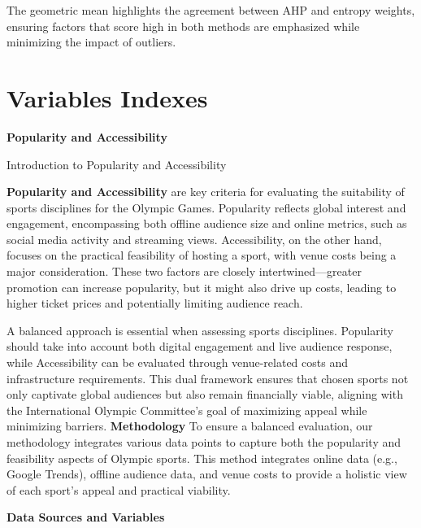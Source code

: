\documentclass[12pt]{article}
\begin{document}
The geometric mean highlights the agreement between AHP and entropy weights, ensuring factors that score high in both methods are emphasized while minimizing the impact of outliers.



\section{Variables Indexes}
\textbf{{Popularity and Accessibility}}

{Introduction to Popularity and Accessibility}

\textbf{Popularity and Accessibility} are key criteria for evaluating the suitability of sports disciplines for the Olympic Games. Popularity reflects global interest and engagement, encompassing both offline audience size and online metrics, such as social media activity and streaming views. Accessibility, on the other hand, focuses on the practical feasibility of hosting a sport, with venue costs being a major consideration. These two factors are closely intertwined—greater promotion can increase popularity, but it might also drive up costs, leading to higher ticket prices and potentially limiting audience reach.

A balanced approach is essential when assessing sports disciplines. Popularity should take into account both digital engagement and live audience response, while Accessibility can be evaluated through venue-related costs and infrastructure requirements. This dual framework ensures that chosen sports not only captivate global audiences but also remain financially viable, aligning with the International Olympic Committee’s goal of maximizing appeal while minimizing barriers.
\textbf{Methodology}
To ensure a balanced evaluation, our methodology integrates various data points to capture both the popularity and feasibility aspects of Olympic sports. This method integrates online data (e.g., Google Trends), offline audience data, and venue costs to provide a holistic view of each sport's appeal and practical viability.

\textbf{Data Sources and Variables}

\end{document}
